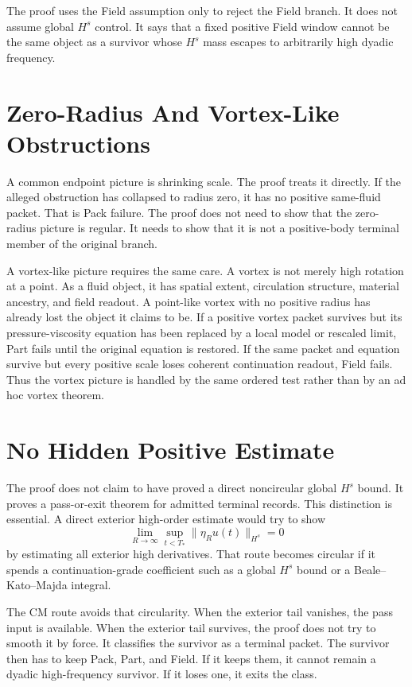 The proof uses the Field assumption only to reject the Field branch.
It does not assume global \(H^s\) control.
It says that a fixed positive Field window cannot be the same object as a survivor whose \(H^s\) mass escapes to arbitrarily high dyadic frequency.

\section{Zero-Radius And Vortex-Like Obstructions}

A common endpoint picture is shrinking scale.
The proof treats it directly.
If the alleged obstruction has collapsed to radius zero, it has no positive same-fluid packet.
That is Pack failure.
The proof does not need to show that the zero-radius picture is regular.
It needs to show that it is not a positive-body terminal member of the original branch.

A vortex-like picture requires the same care.
A vortex is not merely high rotation at a point.
As a fluid object, it has spatial extent, circulation structure, material ancestry, and field readout.
A point-like vortex with no positive radius has already lost the object it claims to be.
If a positive vortex packet survives but its pressure-viscosity equation has been replaced by a local model or rescaled limit, Part fails until the original equation is restored.
If the same packet and equation survive but every positive scale loses coherent continuation readout, Field fails.
Thus the vortex picture is handled by the same ordered test rather than by an ad hoc vortex theorem.

\section{No Hidden Positive Estimate}

The proof does not claim to have proved a direct noncircular global \(H^s\) bound.
It proves a pass-or-exit theorem for admitted terminal records.
This distinction is essential.
A direct exterior high-order estimate would try to show
\[
  \lim_{R\to\infty}\sup_{t<T_*}\|\eta_Ru(t)\|_{H^s}=0
\]
by estimating all exterior high derivatives.
That route becomes circular if it spends a continuation-grade coefficient such as a global \(H^s\) bound or a Beale--Kato--Majda integral.

The CM route avoids that circularity.
When the exterior tail vanishes, the pass input is available.
When the exterior tail survives, the proof does not try to smooth it by force.
It classifies the survivor as a terminal packet.
The survivor then has to keep Pack, Part, and Field.
If it keeps them, it cannot remain a dyadic high-frequency survivor.
If it loses one, it exits the class.

